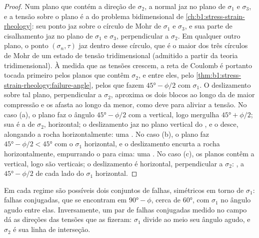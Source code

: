 \begin{proof}
Num plano que contém a direção de $\sigma_2$, a normal jaz no plano de $\sigma_1$ e $\sigma_3$, e a tensão sobre o plano é a do problema bidimensional de
\cref{ch:b1:stress-strain-rheology}: seu ponto jaz sobre o círculo de Mohr de $\sigma_1$ e $\sigma_3$, e sua parte de cisalhamento jaz no plano de $\sigma_1$ e $\sigma_3$, perpendicular a $\sigma_2$.
Em qualquer outro plano, o ponto $(\sigma_n, \tau)$ jaz dentro desse círculo, que é o maior dos três círculos de Mohr de um estado de tensão tridimensional (admitido a partir da teoria tridimensional). À medida que as tensões crescem, a reta de Coulomb é portanto tocada primeiro pelos planos que contêm $\sigma_2$, e entre eles, pelo \cref{thm:b1:stress-strain-rheology:failure-angle}, pelos que fazem $\ang{45} - \phi/2$ com $\sigma_1$. O deslizamento sobre tal plano, perpendicular a $\sigma_2$, aproxima os dois blocos ao longo da  de maior compressão e os afasta ao longo da menor, como deve para aliviar a tensão. No caso (a), o plano faz o ângulo $\ang{45} - \phi/2$ com a
vertical, logo mergulha $\ang{45} + \phi/2$; sua  é a de $\sigma_2$, horizontal; o deslizamento jaz no plano vertical do , e o  desce, alongando a rocha horizontalmente: uma . No caso (b), o plano faz $\ang{45} - \phi/2 < \ang{45}$ com o $\sigma_1$ horizontal, e o deslizamento encurta a rocha horizontalmente, empurrando o  para cima: uma . No caso (c), os planos contêm a vertical, logo são verticais; o deslizamento é horizontal, perpendicular a $\sigma_2$: , a $\ang{45} - \phi/2$ de cada lado do $\sigma_1$ horizontal.
\end{proof}

Em cada regime são possíveis dois conjuntos de falhas, simétricos em torno de $\sigma_1$: falhas conjugadas, que se encontram em $\ang{90} - \phi$, cerca de \ang{60}, com $\sigma_1$ no ângulo agudo entre elas. Inversamente, um par de falhas conjugadas medido no campo dá as direções das tensões que as fizeram: $\sigma_1$ divide ao meio seu ângulo agudo, e $\sigma_2$ é sua linha de interseção.

